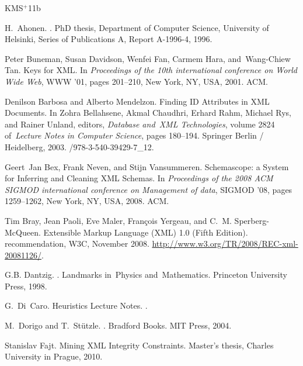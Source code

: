 \newcommand{\etalchar}[1]{$^{#1}$}
\begin{thebibliography}{KMS{\etalchar{+}}11b}

H.~Ahonen.
.
\newblock PhD thesis, Department of Computer Science, University of Helsinki, Series of Publications A, Report A-1996-4, 1996.

\bibitem[BDF{\etalchar{+}}01]{keX}
Peter Buneman, Susan Davidson, Wenfei Fan, Carmem Hara, and~Wang-Chiew Tan.
\newblock Keys for XML.
\newblock In {\em Proceedings of the 10th international conference on World Wide Web}, WWW '01, pages 201--210, New York, NY, USA, 2001. ACM.

Denilson Barbosa and Alberto Mendelzon.
\newblock Finding ID Attributes in XML Documents.
\newblock In Zohra Bellahsene, Akmal Chaudhri, Erhard Rahm, Michael Rys, and Rainer Unland, editors, {\em Database and~XML Technologies}, volume 2824 of~{\em Lecture Notes in Computer Science}, pages 180--194. Springer Berlin / Heidelberg, 2003.
/978-3-540-39429-7\_12.

Geert~Jan Bex, Frank Neven, and Stijn Vansummeren.
\newblock Schemascope: a System for Inferring and Cleaning XML Schemas.
\newblock In {\em Proceedings of the 2008 ACM SIGMOD international conference on Management of data}, SIGMOD '08, pages 1259--1262, New York, NY, USA,
  2008. ACM.

\bibitem[BPM{\etalchar{+}}08]{Bray:08:EML}
Tim Bray, Jean Paoli, Eve Maler, Fran\c{c}ois Yergeau, and C.~M.
  Sperberg-McQueen.
\newblock Extensible Markup Language ({XML}) 1.0 (Fifth Edition).
 recommendation, W3C, November 2008.
\newblock \url{http://www.w3.org/TR/2008/REC-xml-20081126/}.

G.B. Dantzig.
.
\newblock Landmarks in~Physics and~Mathematics. Princeton University Press,
  1998.

G.~Di~Caro.
\newblock Heuristics Lecture Notes.
.

M.~Dorigo and T.~St{\"u}tzle.
.
\newblock Bradford Books. MIT Press, 2004.

Stanislav Fajt.
\newblock Mining XML Integrity Constraints.
\newblock Master's thesis, Charles University in Prague, 2010.


\end{thebibliography}
